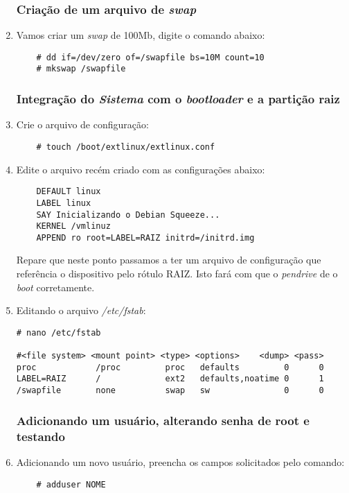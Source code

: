 \documentclass[a4paper,10pt]{article}
\begin{document}
\begin{enumerate}
    \subsubsection{Criação de um arquivo de \emph{swap}}
    \item Vamos criar um \emph{swap} de 100Mb, digite o comando abaixo:
      \begin{lstlisting}
	# dd if=/dev/zero of=/swapfile bs=10M count=10
	# mkswap /swapfile
      \end{lstlisting}

    \subsubsection{Integração do \emph{Sistema} com o \emph{bootloader} e a partição raiz}
    \item Crie o arquivo de configuração:
      \begin{lstlisting}
	# touch /boot/extlinux/extlinux.conf
      \end{lstlisting}
    
    \item Edite o arquivo recém criado com as configurações abaixo:
      \begin{lstlisting}
	DEFAULT linux
	LABEL linux
	SAY Inicializando o Debian Squeeze...
	KERNEL /vmlinuz
	APPEND ro root=LABEL=RAIZ initrd=/initrd.img
      \end{lstlisting}
      Repare que neste ponto passamos a ter um arquivo de configuração que referência o 
      dispositivo pelo rótulo RAIZ. Isto fará com que o \emph{pendrive} de o \emph{boot}
      corretamente.

    \item Editando o arquivo \emph{/etc/fstab}:
      \begin{lstlisting}
# nano /etc/fstab

#<file system> <mount point> <type> <options>    <dump> <pass>
proc            /proc         proc   defaults         0      0
LABEL=RAIZ      /             ext2   defaults,noatime 0      1
/swapfile       none          swap   sw               0      0
      \end{lstlisting}
    \subsubsection{Adicionando um usuário, alterando senha de root e testando}
    \item Adicionando um novo usuário, preencha os campos solicitados pelo comando:
      \begin{lstlisting}
	# adduser NOME
      \end{lstlisting}


\end{enumerate}
\end{document}
